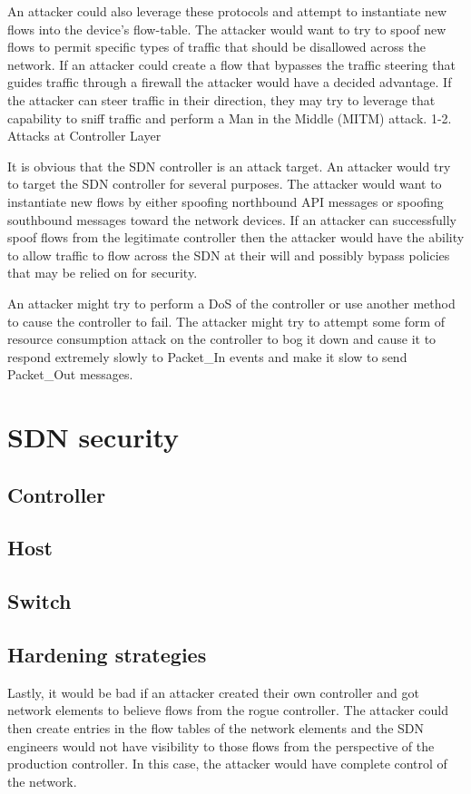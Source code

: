 An attacker could also leverage these protocols and attempt to instantiate new flows into the device’s flow-table.  The attacker would want to try to spoof new flows to permit specific types of traffic that should be disallowed across the network.  If an attacker could create a flow that bypasses the traffic steering that guides traffic through a firewall the attacker would have a decided advantage.  If the attacker can steer traffic in their direction, they may try to leverage that capability to sniff traffic and perform a Man in the Middle (MITM) attack.
1-2. Attacks at Controller Layer

It is obvious that the SDN controller is an attack target.  An attacker would try to target the SDN controller for several purposes.  The attacker would want to instantiate new flows by either spoofing northbound API messages or spoofing southbound messages toward the network devices.  If an attacker can successfully spoof flows from the legitimate controller then the attacker would have the ability to allow traffic to flow across the SDN at their will and possibly bypass policies that may be relied on for security.

An attacker might try to perform a DoS of the controller or use another method to cause the controller to fail. The attacker might try to attempt some form of resource consumption attack on the controller to bog it down and cause it to respond extremely slowly to Packet\_In events and make it slow to send Packet\_Out messages.

\section{SDN security}
\subsection{Controller}
\subsection{Host}
\subsection{Switch}
\subsection{Hardening strategies}
Lastly, it would be bad if an attacker created their own controller and got network elements to believe flows from the rogue controller.  The attacker could then create entries in the flow tables of the network elements and the SDN engineers would not have visibility to those flows from the perspective of the production controller.  In this case, the attacker would have complete control of the network.

